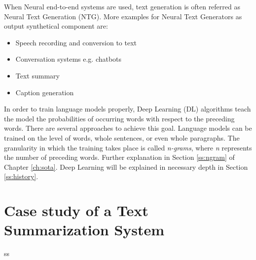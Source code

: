 When Neural end-to-end systems are used, text generation is often referred as Neural Text Generation (NTG). More examples for Neural Text Generators as output synthetical component are:

\begin{itemize}
\item Speech recording and conversion to text
\item Conversation systems e.g. chatbots
\item Text summary
\item Caption generation
\end{itemize} 


In order to train language models properly, Deep Learning (DL) algorithms teach the model the probabilities of occurring words with respect to the preceding words. There are several approaches to achieve this goal. Language models can be trained on the level of words, whole sentences, or even whole paragraphs. The granularity in which the training takes place is called \textit{n-grams}, where \textit{n} represents the number of preceding words. Further explanation in Section \ref{ss:ngram} of Chapter \ref{ch:sota}. Deep Learning will be explained in necessary depth in Section \ref{ss:history}.



\section{Case study of a Text Summarization System}
ss






